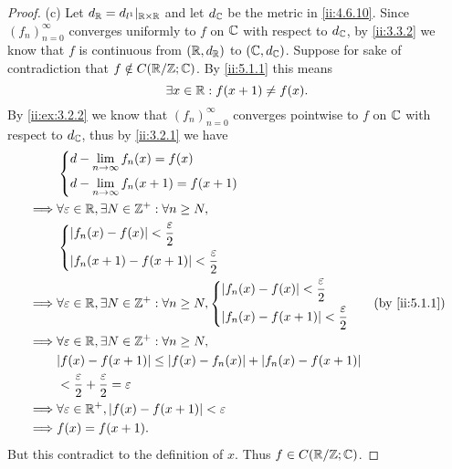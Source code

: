 \begin{proof}{(c)}
  Let \(d_{\mathbb{R}} = d_{l^1}|_{\mathbb{R} \times \mathbb{R}}\) and let \(d_{\mathbb{C}}\) be the metric in \cref{ii:4.6.10}.
  Since \((f_n)_{n = 0}^\infty\) converges uniformly to \(f\) on \(\mathbb{C}\) with respect to \(d_{\mathbb{C}}\), by \cref{ii:3.3.2} we know that \(f\) is continuous from \((\mathbb{R}, d_{\mathbb{R}})\) to \((\mathbb{C}, d_{\mathbb{C}})\).
  Suppose for sake of contradiction that \(f \notin C(\mathbb{R} / \mathbb{Z} ; \mathbb{C})\).
  By \cref{ii:5.1.1} this means
  \[
    \exists x \in \mathbb{R} : f(x + 1) \neq f(x).
  \]
  By \cref{ii:ex:3.2.2} we know that \((f_n)_{n = 0}^\infty\) converges pointwise to \(f\) on \(\mathbb{C}\) with respect to \(d_{\mathbb{C}}\), thus by \cref{ii:3.2.1} we have
  \begin{align*}
             & \begin{dcases}
                 d - \lim_{n \to \infty} f_n(x) = f(x) \\
                 d - \lim_{n \to \infty} f_n(x + 1) = f(x + 1)
               \end{dcases}                                                                       \\
    \implies & \forall \varepsilon \in \R, \exists N \in \Z^+ : \forall n \geq N,                                                 \\
             & \begin{dcases}
                 \abs{f_n(x) - f(x)} < \dfrac{\varepsilon}{2} \\
                 \abs{f_n(x + 1) - f(x + 1)} < \dfrac{\varepsilon}{2}
               \end{dcases}                                                                \\
    \implies & \forall \varepsilon \in \R, \exists N \in \Z^+ : \forall n \geq N, \begin{dcases}
                                                                                    \abs{f_n(x) - f(x)} < \dfrac{\varepsilon}{2} \\
                                                                                    \abs{f_n(x) - f(x + 1)} < \dfrac{\varepsilon}{2}
                                                                                  \end{dcases} &  & \by{ii:5.1.1} \\
    \implies & \forall \varepsilon \in \R, \exists N \in \Z^+ : \forall n \geq N,                                                 \\
             & \abs{f(x) - f(x + 1)} \leq \abs{f(x) - f_n(x)} + \abs{f_n(x) - f(x + 1)}                                           \\
             & < \dfrac{\varepsilon}{2} + \dfrac{\varepsilon}{2} = \varepsilon                                                    \\
    \implies & \forall \varepsilon \in \R^+, \abs{f(x) - f(x + 1)} < \varepsilon                                                  \\
    \implies & f(x) = f(x + 1).
  \end{align*}
  But this contradict to the definition of \(x\).
  Thus \(f \in C(\mathbb{R} / \mathbb{Z} ; \mathbb{C})\).
\end{proof}

